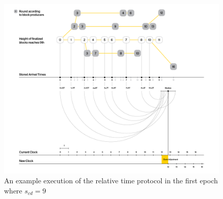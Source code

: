 \begin{figure}[h]
	\centering
	\includegraphics[width=1.\textwidth]{images/BABE3.png}
	\caption{An example execution of the relative time protocol in the first epoch where $s_{cd} = 9$}
	\label{fig:relativetime}
\end{figure}
